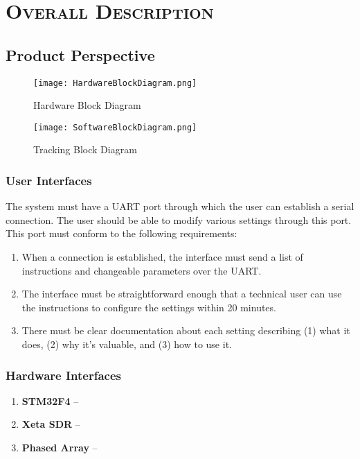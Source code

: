 \documentclass[ProjectRequirements.tex]{subfiles}
\begin{document}
\bigskip

\section{\textsc{\Large Overall Description}}
	\subsection{Product Perspective}
	\begin{figure}[H]
		\centering
		\texttt{[image: HardwareBlockDiagram.png]}
		\caption{Hardware Block Diagram \label{fig:HardwareBlockDiagram}}
	\end{figure}
	\begin{figure}[H]
		\centering
		\texttt{[image: SoftwareBlockDiagram.png]}
		\caption{Tracking Block Diagram \label{fig:SoftwareBlockDiagram}}
	\end{figure}
			
		\subsubsection{User Interfaces}
			The system must have a UART port through which the user can establish a serial connection. The user should be able to modify various settings through this port. This port must conform to the following requirements:
			\begin{enumerate}
				\item When a connection is established, the interface must send a list of instructions and changeable parameters over the UART.
				\item The interface must be straightforward enough that a technical user can use the instructions to configure the settings within 20 minutes.
				\item There must be clear documentation about each setting describing (1) what it does, (2) why it's valuable, and (3) how to use it.
			\end{enumerate}	
			
		\subsubsection{Hardware Interfaces}
			\begin{enumerate}\itemsep1pt
				\item \textbf{STM32F4} -- 
				\item \textbf{Xeta SDR} -- 
				\item \textbf{Phased Array} -- 
			\end{enumerate}
			
\end{document}
